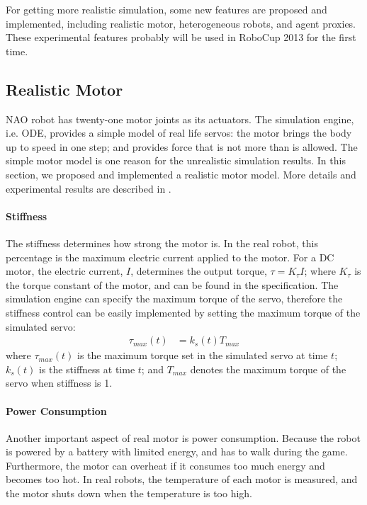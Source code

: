 \documentclass{llncs}
\begin{document}
For getting more realistic simulation, some new features are proposed and implemented, including realistic motor, heterogeneous robots, and agent proxies.
These experimental features probably will be used in RoboCup 2013 for the first time.

\subsection{Realistic Motor}
NAO robot has twenty-one motor joints as its actuators.
The simulation engine, i.e. ODE, provides a simple model of real life servos:
the motor brings the body up to speed in one step; and provides force that is not more than is allowed.
The simple motor model is one reason for the unrealistic simulation results.
In this section, we proposed and implemented a realistic motor model. More details and experimental results are described in \cite{Xu2012}.

\paragraph{Stiffness}
The stiffness determines how strong the motor is.
In the real robot, this percentage is the maximum electric current applied to the motor.
For a DC motor, the electric current, $I$, determines the output torque,
$\tau = K_\tau I \label{eq:tau-i}$;
where $K_\tau$ is the torque constant of the motor, and can be found in the
specification.
The simulation engine can specify the maximum torque of the servo, therefore the
stiffness control can be easily implemented by setting the maximum torque
of the simulated servo:
\begin{align}
  \tau_{max}(t) &= k_{s}(t) T_{max}
\end{align}
where $\tau_{max}(t)$ is the maximum torque set in the simulated servo at
time $t$; $k_{s}(t)$ is the stiffness at time $t$; and $T_{max}$
denotes the maximum torque of the servo when stiffness is 1.

\paragraph{Power Consumption}
Another important aspect of real motor is power consumption.
Because the robot is powered by a battery with limited energy, and has to walk during the
game.
Furthermore, the motor can overheat if it consumes too much energy and becomes too hot.
In real robots, the temperature of each motor is measured, and the motor shuts down 
when the temperature is too high.
\end{document}
